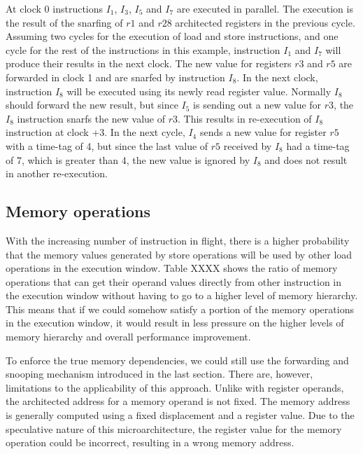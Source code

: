 \documentclass[10pt,twocolumn]{IEEEtran}
\begin{document}
At clock 0 instructions $I_1$, $I_3$, $I_5$ and $I_7$ are executed in
parallel.  The execution is the result of the snarfing of $r1$ and $r28$
architected registers in the previous cycle.  
Assuming two cycles for the execution
of load and store instructions, and one cycle for the rest of the
instructions in this example, instruction $I_1$ and $I_7$ will produce
their results in the next clock.  
The new value for registers $r3$ and $r5$
are forwarded in clock 1 and are snarfed by instruction $I_8$.   
In the next clock,
instruction $I_8$ will be executed using its newly read register value.
Normally $I_8$ should forward the new result, but since $I_5$ is sending
out a new value for $r3$, the $I_8$ instruction snarfs the new value of
$r3$. 
This results in re-execution of $I_8$ instruction at clock +3.  In
the next cycle, $I_4$ sends a new value for register $r5$ with a time-tag
of 4, but since the last value of $r5$ received by $I_8$ had a time-tag
of 7, which is greater than 4, the new value is ignored by $I_8$ and
does not result in another re-execution.

\subsection {Memory operations}

With the increasing number of instruction in flight, there is a higher
probability that the memory values generated by store operations will
be used by other load operations in the execution window.  Table XXXX
shows the ratio of memory operations that can get their operand values
directly from other instruction in the execution window without having
to go to a higher level of memory hierarchy.  This means that if we
could somehow satisfy a portion of the memory operations in the
execution window, it would result in less pressure on the higher levels
of memory hierarchy and overall performance improvement.

To enforce the true memory dependencies, we could still use the
forwarding and snooping mechanism introduced in the last section.
There are, however, limitations to the applicability of this approach.
Unlike with register operands, the architected address for a memory
operand is not fixed.  The memory address is generally computed using a
fixed displacement and a register value.  Due to the speculative nature
of this microarchitecture, the register value for the memory operation
could be incorrect, resulting in a wrong memory address.
\end{document}

